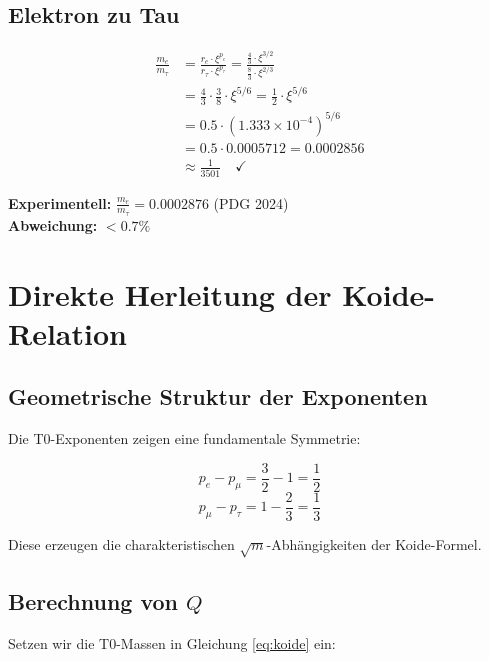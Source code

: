 	\subsection{Elektron zu Tau}
	
	\begin{beweis}
		\begin{align}
			\frac{m_e}{m_\tau} &= \frac{r_e \cdot \xi^{p_e}}{r_\tau \cdot \xi^{p_\tau}} = \frac{\frac{4}{3} \cdot \xi^{3/2}}{\frac{8}{3} \cdot \xi^{2/3}} \\
			&= \frac{4}{3} \cdot \frac{3}{8} \cdot \xi^{5/6} = \frac{1}{2} \cdot \xi^{5/6} \\
			&= 0.5 \cdot (1.333 \times 10^{-4})^{5/6} \\
			&= 0.5 \cdot 0.0005712 = 0.0002856 \\
			&\approx \frac{1}{3501} \quad \checkmark
		\end{align}
		
		\textbf{Experimentell:} $\frac{m_e}{m_\tau} = 0.0002876$ (PDG 2024)\\
		\textbf{Abweichung:} $< 0.7\%$
	\end{beweis}
	
	\section{Direkte Herleitung der Koide-Relation}
	
	\subsection{Geometrische Struktur der Exponenten}
	
	Die T0-Exponenten zeigen eine fundamentale Symmetrie:
	
	\begin{equation}
		p_e - p_\mu = \frac{3}{2} - 1 = \frac{1}{2}
	\end{equation}
	\begin{equation}
		p_\mu - p_\tau = 1 - \frac{2}{3} = \frac{1}{3}
	\end{equation}
	
	Diese erzeugen die charakteristischen $\sqrt{m}$-Abhängigkeiten der Koide-Formel.
	
	\subsection{Berechnung von $Q$}
	
	Setzen wir die T0-Massen in Gleichung \eqref{eq:koide} ein:
	
